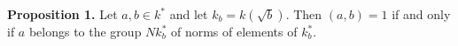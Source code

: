\textbf{Proposition 1.} Let $a, b \in k^*$ and let $k_b = k(\sqrt{b})$. Then $(a, b) = 1$ if and only if $a$ belongs to the group $N k_b^*$ of norms of elements of $k_b^*$.
